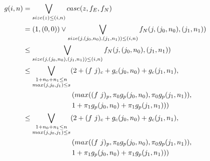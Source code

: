 \begin{align*}
  g(i,n) &= \bigvee\limits_{size(z) \leq (i,n)} case(z,f_E,f_N) \\
         &= (1,(0,0)) \vee \bigvee\limits_{size(j,(j_0,n_0),(j_1,n_1)) \leq (i,n)} f_N(j,(j_0,n_0),(j_1,n_1)) \\
         &\leq \bigvee\limits_{size(j,(j_0,n_0),(j_1,n_1)) \leq (i,n)} f_N(j,(j_0,n_0),(j_1,n_1)) \\
         &\leq \bigvee\limits_{\substack{1 + n_0 + n_1 \leq n\\max(j,j_0,j_1)\leq s}} (2 + (f\ j)_c + g_c(j_0,n_0) + g_c(j_1,n_1), \\
         &\qquad\quad\quad\quad\quad\quad (max((f\ j)_p, \pi_0g_p(j_0,n_0), \pi_0g_p(j_1,n_1)), \\
         &\qquad\quad\quad\quad\quad\quad 1 + \pi_1g_p(j_0,n_0) + \pi_1g_p(j_1,n_1))) \\
         &\leq \bigvee\limits_{\substack{1 + n_0 + n_1 \leq n\\max(j,j_0,j_1)\leq s}} (2 + (f\ j)_c + g_c(j_0,n_0) + g_c(j_1,n_1), \\
         &\qquad\quad\quad\quad\quad\quad (max((f\ j)_p, \pi_0g_p(j_0,n_0), \pi_0g_p(j_1,n_1)), \\
         &\qquad\quad\quad\quad\quad\quad 1 + \pi_1g_p(j_0,n_0) + \pi_1g_p(j_1,n_1)))
\end{align*}
%
